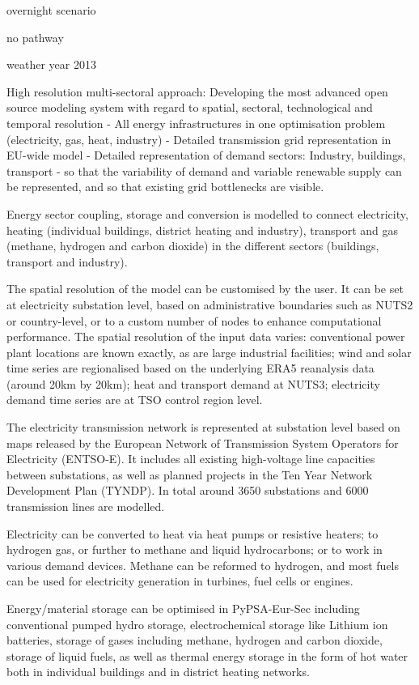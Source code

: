 overnight scenario

no pathway

weather year 2013

High resolution multi-sectoral approach: Developing the most advanced open source modeling system with regard to spatial, sectoral, technological and temporal resolution
- All energy infrastructures in one optimisation problem (electricity, gas, heat, industry)
- Detailed transmission grid representation in EU-wide model
- Detailed representation of demand sectors: Industry, buildings, transport
- so that the variability of demand and variable renewable supply can be represented, and so that existing grid bottlenecks are visible.

Energy sector coupling, storage and conversion is modelled to connect
electricity, heating (individual buildings, district heating and industry),
transport and gas (methane, hydrogen and carbon dioxide) in the different
sectors (buildings, transport and industry).

The spatial resolution of the model can be customised by the user. It can be set
at electricity substation level, based on administrative boundaries such as
NUTS2 or country-level, or to a custom number of nodes to enhance computational
performance. The spatial resolution of the input data varies: conventional power
plant locations are known exactly, as are large industrial facilities; wind and
solar time series are regionalised based on the underlying ERA5 reanalysis data
(around 20km by 20km); heat and transport demand at NUTS3; electricity demand
time series are at TSO control region level.

The electricity transmission
network is represented at substation level based on maps released by the
European Network of Transmission System Operators for Electricity (ENTSO-E). It
includes all existing high-voltage line capacities between substations, as well
as planned projects in the Ten Year Network Development Plan (TYNDP). In total
around 3650 substations and 6000 transmission lines are modelled.

Electricity can be converted to heat via heat pumps or resistive heaters; to
hydrogen gas, or further to methane and liquid hydrocarbons; or to work in
various demand devices. Methane can be reformed to hydrogen, and most fuels can
be used for electricity generation in turbines, fuel cells or engines.

Energy/material storage can be optimised in PyPSA-Eur-Sec including conventional
pumped hydro storage, electrochemical storage like Lithium ion batteries,
storage of gases including methane, hydrogen and carbon dioxide, storage of
liquid fuels, as well as thermal energy storage in the form of hot water both in
individual buildings and in district heating networks.


